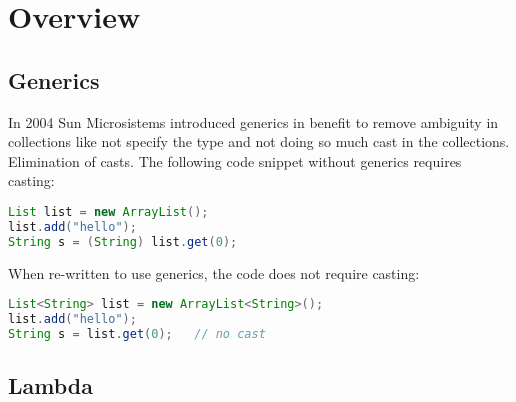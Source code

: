 \documentclass{sig-alternate-05-2015}
\begin{document}


\section{Overview}

\subsection{Generics}
In 2004 Sun Microsistems introduced generics in benefit to remove ambiguity in collections like not specify the type and not doing so much cast in the collections.
Elimination of casts. The following code snippet without generics requires casting:

\begin{lstlisting}[language=java]
List list = new ArrayList();
list.add("hello");
String s = (String) list.get(0);
\end{lstlisting}

When re-written to use generics, the code does not require casting:

\begin{lstlisting}[language=java]
List<String> list = new ArrayList<String>();
list.add("hello");
String s = list.get(0);   // no cast

\end{lstlisting}
\subsection{Lambda}
\end{document}
